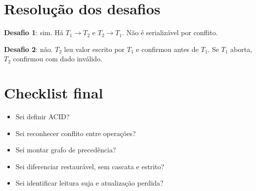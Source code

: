 \documentclass[12pt,a4paper]{article}
\begin{document}
\section{Resolução dos desafios}
\textbf{Desafio 1}: sim. Há $T_1\rightarrow T_2$ e $T_2\rightarrow T_1$. Não é serializável por conflito.

\textbf{Desafio 2}: não. $T_2$ leu valor escrito por $T_1$ e confirmou antes de $T_1$. Se $T_1$ aborta, $T_2$ confirmou com dado inválido.

\section{Checklist final}
\begin{itemize}
    \item Sei definir ACID?
    \item Sei reconhecer conflito entre operações?
    \item Sei montar grafo de precedência?
    \item Sei diferenciar restaurável, sem cascata e estrito?
    \item Sei identificar leitura suja e atualização perdida?
\end{itemize}
\end{document}
